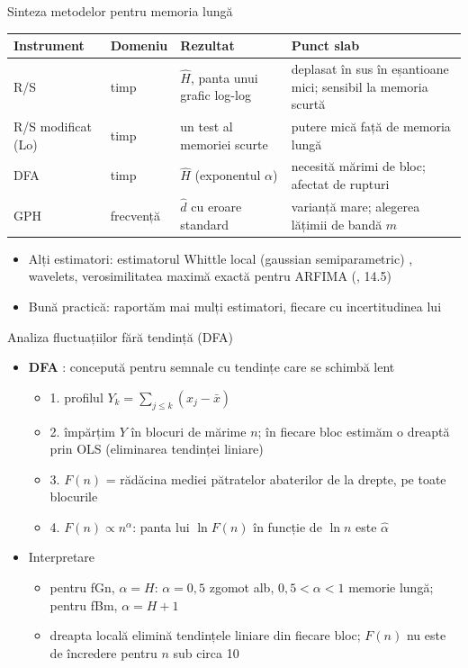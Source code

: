 \begin{frame}{Sinteza metodelor pentru memoria lungă}
\itemsize{\small}
\begin{center}
\scriptsize
\begin{tabular}{>{\raggedright\arraybackslash}p{2.0cm}>{\raggedright\arraybackslash}p{1.7cm}>{\raggedright\arraybackslash}p{3.4cm}>{\raggedright\arraybackslash}p{3.6cm}}
\toprule
\textbf{Instrument} & \textbf{Domeniu} & \textbf{Rezultat} & \textbf{Punct slab} \\
\midrule
R/S & timp & $\hat H$, panta unui grafic log-log & deplasat în sus în eșantioane mici; sensibil la memoria scurtă \\
R/S modificat (Lo) & timp & un test al memoriei scurte & putere mică față de memoria lungă \\
DFA & timp & $\hat H$ (exponentul $\alpha$) & necesită mărimi de bloc; afectat de rupturi \\
GPH & frecvență & $\hat d$ cu eroare standard & varianță mare; alegerea lățimii de bandă $m$ \\
\bottomrule
\end{tabular}
\end{center}
\begin{itemize}
    \item Alți estimatori: estimatorul Whittle local (gaussian semiparametric) , wavelets, verosimilitatea maximă exactă pentru ARFIMA (, 14.5)
    \item Bună practică: raportăm mai mulți estimatori, fiecare cu incertitudinea lui
\end{itemize}
\end{frame}

\begin{frame}{Analiza fluctuațiilor fără tendință (DFA)}
\itemsize{\small}
\begin{itemize}
    \item \textbf{DFA} : concepută pentru semnale cu tendințe care se schimbă lent
    \begin{itemize}
        \item 1. profilul $Y_k = \sum_{j \le k}(x_j - \bar x)$
        \item 2. împărțim $Y$ în blocuri de mărime $n$; în fiecare bloc estimăm o dreaptă prin OLS (eliminarea tendinței liniare)
        \item 3. $F(n)$ = rădăcina mediei pătratelor abaterilor de la drepte, pe toate blocurile
        \item 4. $F(n) \propto n^{\alpha}$: panta lui $\ln F(n)$ în funcție de $\ln n$ este $\hat\alpha$
    \end{itemize}
    \item Interpretare
    \begin{itemize}
        \item pentru fGn, $\alpha = H$: $\alpha = 0{,}5$ zgomot alb, $0{,}5 < \alpha < 1$ memorie lungă; pentru fBm, $\alpha = H + 1$
        \item dreapta locală elimină tendințele liniare din fiecare bloc; $F(n)$ nu este de încredere pentru $n$ sub circa 10 
    \end{itemize}
\end{itemize}
\end{frame}

